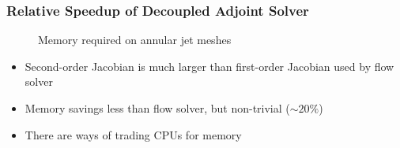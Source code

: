 \documentclass{beamer}
\begin{document}
\begin{frame}
  \frametitle{Relative Speedup of Decoupled Adjoint Solver}
  \vspace{-0.1cm}
  \begin{figure}[h]
    \centering
    \caption{Memory required on annular jet meshes}
  \end{figure}
  \vspace{-0.2cm}
  \begin{itemize}
    \item Second-order Jacobian is much larger than first-order Jacobian used by
      flow solver
    \item Memory savings less than flow solver, but non-trivial ($\sim 20\%$)
    \item There are ways of trading CPUs for memory
  \end{itemize}
\end{frame}
\end{document}
